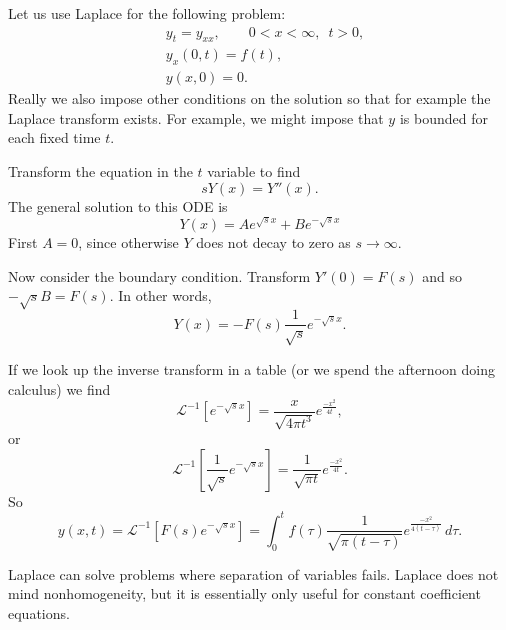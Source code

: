 \begin{example}
Let us use Laplace for the following problem:
\begin{align*}
& y_t = y_{xx}, \qquad 0 < x < \infty, \enspace t > 0,\\
& y_x(0,t) = f(t), \\
& y(x,0) = 0 .
\end{align*}
Really we also impose other conditions on the solution so that for example
the Laplace transform exists.  For example, we might impose that $y$ is
bounded for each fixed time $t$.

Transform the equation in the $t$ variable to find
\begin{equation*}
sY(x) = Y''(x) .
\end{equation*}
The general solution to this ODE is
\begin{equation*}
Y(x) = A e^{\sqrt{s}x} + B e^{-\sqrt{s} x}
\end{equation*}
First $A=0$, since otherwise $Y$ does not decay to zero as $s \to \infty$.

Now consider the boundary condition.
Transform $Y'(0) = F(s)$ and so $-\sqrt{s}B = F(s)$.
In other words,
\begin{equation*}
Y(x) = - F(s) \frac{1}{\sqrt{s}} e^{-\sqrt{s} x} .
\end{equation*}

If we look up the inverse transform in a table (or we spend the afternoon
doing calculus) we find 
\begin{equation*}
{\mathcal L}^{-1}\left[e^{-\sqrt{s} x}\right] =
\frac{x}{\sqrt{4\pi t^3}} e^{\frac{-x^2}{4t}} ,
\end{equation*}
or
\begin{equation*}
{\mathcal L}^{-1}\left[\frac{1}{\sqrt{s}} e^{-\sqrt{s} x}\right] =
\frac{1}{\sqrt{\pi t}} e^{\frac{-x^2}{4t}} .
\end{equation*}
So
\begin{equation*}
y(x,t) =
{\mathcal L}^{-1} \left[
F(s) e^{-\sqrt{s} x}\right]
=
\int_0^t
f(\tau) 
\frac{1}{\sqrt{\pi {(t-\tau)}}} e^{\frac{-x^2}{4(t-\tau)}} \, d\tau .
\end{equation*}
\end{example}

Laplace can solve problems where separation of variables fails.
Laplace does not mind nonhomogeneity, but it is essentially only useful for
constant coefficient equations.


